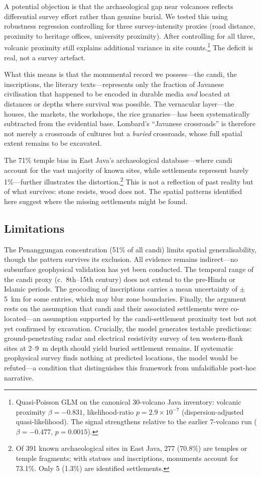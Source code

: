 \documentclass[12pt,a4paper]{article}
\begin{document}
A potential objection is that the archaeological gap near volcanoes reflects differential survey effort rather than genuine burial.
We tested this using robustness regression controlling for three survey-intensity proxies (road distance, proximity to heritage offices, university proximity).
After controlling for all three, volcanic proximity still explains additional variance in site counts.\footnote{Quasi-Poisson GLM on the canonical 30-volcano Java inventory: volcanic proximity $\beta = -0.831$, likelihood-ratio $p = 2.9 \times 10^{-7}$ (dispersion-adjusted quasi-likelihood). The signal strengthens relative to the earlier 7-volcano run ($\beta = -0.477$, $p = 0.0015$).}
The deficit is real, not a survey artefact.

What this means is that the monumental record we possess---the candi, the inscriptions, the literary texts---represents only the fraction of Javanese civilisation that happened to be encoded in durable media \emph{and} located at distances or depths where survival was possible.
The vernacular layer---the houses, the markets, the workshops, the rice granaries---has been systematically subtracted from the evidential base.
Lombard's ``Javanese crossroads'' is therefore not merely a crossroads of cultures but a \emph{buried} crossroads, whose full spatial extent remains to be excavated.

The 71\% temple bias in East Java's archaeological database---where candi account for the vast majority of known sites, while settlements represent barely 1\%---further illustrates the distortion.\footnote{Of 391 known archaeological sites in East Java, 277 (70.8\%) are temples or temple fragments; with statues and inscriptions, monuments account for 73.1\%. Only 5 (1.3\%) are identified settlements.}
This is not a reflection of past reality but of what survives: stone resists, wood does not.
The spatial patterns identified here suggest where the missing settlements might be found.

\subsection{Limitations}

The Penanggungan concentration (51\% of all candi) limits spatial generalisability, though the pattern survives its exclusion.
All evidence remains indirect---no subsurface geophysical validation has yet been conducted.
The temporal range of the candi proxy (c.~8th--15th century) does not extend to the pre-Hindu or Islamic periods.
The geocoding of inscriptions carries a mean uncertainty of $\pm$5~km for some entries, which may blur zone boundaries.
Finally, the argument rests on the assumption that candi and their associated settlements were co-located---an assumption supported by the candi-settlement proximity test but not yet confirmed by excavation.
Crucially, the model generates testable predictions: ground-penetrating radar and electrical resistivity survey of ten western-flank sites at 2--9~m depth should yield buried settlement remains.
If systematic geophysical survey finds nothing at predicted locations, the model would be refuted---a condition that distinguishes this framework from unfalsifiable post-hoc narrative.
\end{document}
